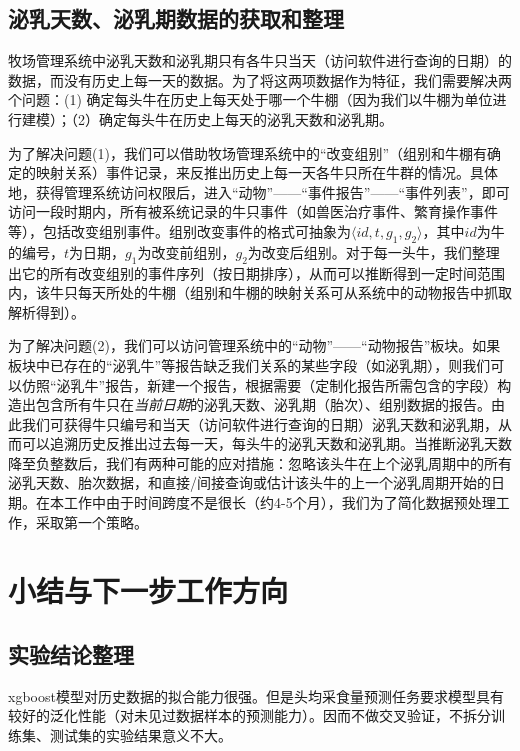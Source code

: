 \begin{appendix}

\section{泌乳天数、泌乳期数据的获取和整理}
\label{calving_data}

牧场管理系统中泌乳天数和泌乳期只有各牛只当天（访问软件进行查询的日期）的数据，而没有历史上每一天的数据。为了将这两项数据作为特征，我们需要解决两个问题：(1) 确定每头牛在历史上每天处于哪一个牛棚（因为我们以牛棚为单位进行建模）；（2）确定每头牛在历史上每天的泌乳天数和泌乳期。
	
为了解决问题(1)，我们可以借助牧场管理系统中的“改变组别”（组别和牛棚有确定的映射关系）事件记录，来反推出历史上每一天各牛只所在牛群的情况。具体地，获得管理系统访问权限后，进入“动物”——“事件报告”——“事件列表”，即可访问一段时期内，所有被系统记录的牛只事件（如兽医治疗事件、繁育操作事件等），包括改变组别事件。组别改变事件的格式可抽象为$\langle id, t, g_1, g_2\rangle$，其中$id$为牛的编号，$t$为日期，$g_1$为改变前组别，$g_2$为改变后组别。对于每一头牛，我们整理出它的所有改变组别的事件序列（按日期排序），从而可以推断得到一定时间范围内，该牛只每天所处的牛棚（组别和牛棚的映射关系可从系统中的动物报告中抓取解析得到）。

为了解决问题(2)，我们可以访问管理系统中的“动物”——“动物报告”板块。如果板块中已存在的“泌乳牛”等报告缺乏我们关系的某些字段（如泌乳期），则我们可以仿照“泌乳牛”报告，新建一个报告，根据需要（定制化报告所需包含的字段）构造出包含所有牛只在\emph{当前日期}的泌乳天数、泌乳期（胎次）、组别数据的报告。由此我们可获得牛只编号和当天（访问软件进行查询的日期）泌乳天数和泌乳期，从而可以追溯历史反推出过去每一天，每头牛的泌乳天数和泌乳期。当推断泌乳天数降至负整数后，我们有两种可能的应对措施：忽略该头牛在上个泌乳周期中的所有泌乳天数、胎次数据，和直接/间接查询或估计该头牛的上一个泌乳周期开始的日期。在本工作中由于时间跨度不是很长（约4-5个月），我们为了简化数据预处理工作，采取第一个策略。
	
	
\end{appendix}
\section{小结与下一步工作方向}
\label{futurework}

\subsection{实验结论整理}

xgboost模型对历史数据的拟合能力很强。但是头均采食量预测任务要求模型具有较好的泛化性能（对未见过数据样本的预测能力）。因而不做交叉验证，不拆分训练集、测试集的实验结果意义不大。

